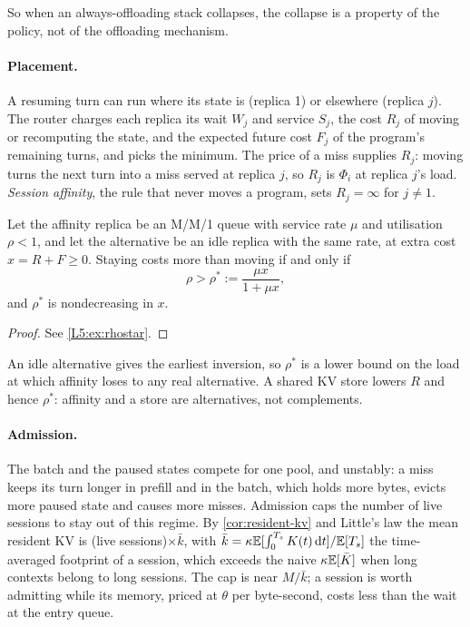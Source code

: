 So when an always-offloading stack collapses, the collapse is a property of
the policy, not of the offloading mechanism.

\paragraph{Placement.} A resuming turn can run where its state is (replica
1) or elsewhere (replica $j$). The router charges each replica its wait $W_j$
and service $S_j$, the cost $R_j$ of moving or recomputing the state, and
the expected future cost $F_j$ of the program's remaining turns, and picks
the minimum. The price of a miss supplies $R_j$: moving turns the next turn
into a miss served at replica $j$, so $R_j$ is $\Phi_i$ at replica $j$'s
load. \emph{Session affinity}, the rule that never moves a program, sets
$R_j=\infty$ for $j\ne1$.

\begin{proposition}\label{L5:prop:rhostar}
Let the affinity replica be an M/M/1 queue with service rate $\mu$ and
utilisation $\rho<1$, and let the alternative be an idle replica with the
same rate, at extra cost $x=R+F\ge0$. Staying costs more than moving if and
only if
\[
  \rho>\rho^*:=\frac{\mu x}{1+\mu x},
\]
and $\rho^*$ is nondecreasing in $x$.
\end{proposition}

\begin{proof}See \cref{L5:ex:rhostar}.\end{proof}

An idle alternative gives the earliest inversion, so $\rho^*$ is a lower
bound on the load at which affinity loses to any real alternative. A shared
KV store lowers $R$ and hence $\rho^*$: affinity and a store are
alternatives, not complements.

\paragraph{Admission.} The batch and the paused states compete for one pool, and
unstably: a miss keeps its turn longer in prefill and in the batch, which holds more
bytes, evicts more paused state and causes more misses. Admission caps the number of
live sessions to stay out of this regime. By \cref{cor:resident-kv} and Little's law
the mean resident KV is (live sessions)$\times\bar k$, with
$\bar k=\kappa\mathbb{E}[\int_0^{T_s}K(t)\,\mathrm{d} t]/\mathbb{E}[T_s]$ the time-averaged footprint of a
session, which exceeds the naive $\kappa\mathbb{E}[\bar K]$ when long contexts belong to long
sessions. The cap is near $M/\bar k$; a session is worth admitting while its memory,
priced at $\theta$ per byte-second, costs less than the wait at the entry queue.

